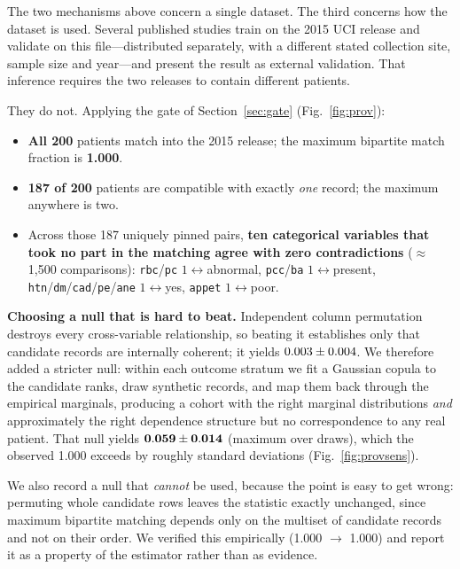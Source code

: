 \documentclass[conference]{IEEEtran}
\begin{document}
The two mechanisms above concern a single dataset. The third concerns how the
dataset is used. Several published studies train on the 2015 UCI release and
validate on this file---distributed separately, with a different stated
collection site, sample size and year---and present the result as external
validation. That inference requires the two releases to contain different
patients.

They do not. Applying the gate of Section~\ref{sec:gate}
(Fig.~\ref{fig:prov}):

\begin{itemize}
  \item \textbf{All 200} patients match into the 2015 release; the maximum
        bipartite match fraction is \textbf{1.000}.
  \item \textbf{187 of 200} patients are compatible with exactly \emph{one}
        record; the maximum anywhere is two.
  \item Across those 187 uniquely pinned pairs, \textbf{ten categorical
        variables that took no part in the matching agree with zero
        contradictions} ($\approx$1{,}500 comparisons):
        \texttt{rbc}/\texttt{pc} $1\!\leftrightarrow\!$abnormal,
        \texttt{pcc}/\texttt{ba} $1\!\leftrightarrow\!$present,
        \texttt{htn}/\texttt{dm}/\texttt{cad}/\texttt{pe}/\texttt{ane}
        $1\!\leftrightarrow\!$yes, \texttt{appet}
        $1\!\leftrightarrow\!$poor.
\end{itemize}

\textbf{Choosing a null that is hard to beat.} Independent column permutation
destroys every cross-variable relationship, so beating it establishes only
that candidate records are internally coherent; it yields
$0.003 \pm 0.004$. We therefore added a stricter null: within each outcome
stratum we fit a Gaussian copula to the candidate ranks, draw synthetic
records, and map them back through the empirical marginals, producing a
cohort with the right marginal distributions \emph{and} approximately the
right dependence structure but no correspondence to any real patient. That
null yields $\mathbf{0.059 \pm 0.014}$
(maximum \NullCopulaMax{} over \NullDraws{} draws), which the observed
1.000 exceeds by roughly \NullCopulaSDDistance{} standard deviations
(Fig.~\ref{fig:provsens}).

We also record a null that \emph{cannot} be used, because the point is easy
to get wrong: permuting whole candidate rows leaves the statistic exactly
unchanged, since maximum bipartite matching depends only on the multiset of
candidate records and not on their order. We verified this empirically
(1.000 $\rightarrow$ 1.000) and report it as a property of the estimator
rather than as evidence.
\end{document}
